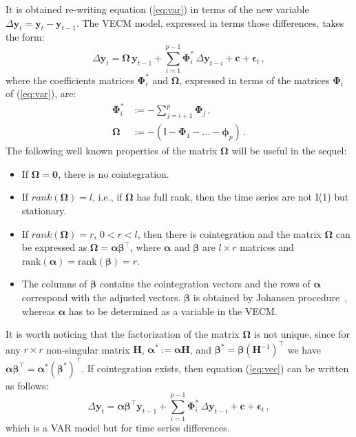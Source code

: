 It is obtained re-writing equation (\ref{eq:var}) in terms of the new
variable $\Delta\mathbf{y}_t=\mathbf{y}_t-\mathbf{y}_{t-1}$.
The VECM model, expressed in terms those differences, takes the form:
\begin{equation}\label{eq:vec}
\Delta \mathbf{y}_t 
= \boldsymbol{\Omega}\,\mathbf{y}_{t-1}
  + \sum_{i=1}^{p-1} \boldsymbol{\Phi}_i^*\,\Delta\mathbf{y}_{t-i}
  + \mathbf{c} + \boldsymbol{\epsilon}_t\,,
\end{equation}
\noindent
where the coefficients matrices $\boldsymbol{\Phi}_i^*$ and 
$\boldsymbol{\Omega}$, expressed in terms of the matrices
$\boldsymbol{\Phi}_i$ of (\ref{eq:var}), are:
\begin{align*}
\boldsymbol{\Phi}_i^* 
&:= -\sum_{j=i+1}^{p}\boldsymbol{\Phi}_j\,, \\
\boldsymbol{\Omega}
&:= -\left( \mathbb{I} - \boldsymbol{\Phi}_1 - \dots 
    - \boldsymbol{\phi}_p \right)\,. 
\end{align*}
The following well known properties of the matrix $\boldsymbol{\Omega}$
\cite{johansen1995} will be useful in the sequel:
\begin{itemize}
\item
If $\boldsymbol{\Omega} = \mathbf{0}$, there is no cointegration.
\item 
If $rank(\boldsymbol{\Omega})=l$, i.e., if $\boldsymbol{\Omega}$ has
full rank, then the time series are not I(1) but stationary.
\item
If $rank(\boldsymbol{\Omega})=r$, $0<r<l$, then there is cointegration
and the matrix $\boldsymbol{\Omega}$ can be expressed as
$\boldsymbol{\Omega}=\boldsymbol{\alpha\beta}^\top$, where $\boldsymbol{\alpha}$
and $\boldsymbol{\beta}$ are
$l\times r$ matrices and
$\text{rank}(\boldsymbol{\alpha})=\text{rank}(\boldsymbol{\beta})=r$.
\item
The columns of $\boldsymbol{\beta}$ contains the cointegration vectors and the rows of
$\boldsymbol{\alpha}$ correspond with the adjusted vectors. 
$\boldsymbol{\beta}$ is obtained by Johansen procedure~\cite{johansen1988},
whereas $\boldsymbol{\alpha}$ has to be determined as a variable in the VECM.
\end{itemize}
It is worth noticing that the factorization of the matrix
$\boldsymbol\Omega$ is not unique, since for any $r \times r$
non-singular matrix $\mathbf{H}$, $\boldsymbol{\alpha}^*:=\boldsymbol{\alpha}\mathbf{H}$,
and $\boldsymbol{\beta}^*=\boldsymbol{\beta}(\mathbf{H}^{-1})^\top$ we have
$\boldsymbol{\alpha\beta}^\top=\boldsymbol{\alpha}^*(\boldsymbol{\beta}^*)^\top$.
If cointegration exists, then equation (\ref{eq:vec}) can be written
as follows:
\begin{equation}\label{eq:vecfull}
\Delta\mathbf{y}_t 
= \boldsymbol{\alpha\beta}^\top\mathbf{y}_{t-1} 
  + \sum_{i=1}^{p-1}\boldsymbol{\Phi}_i^*\,\Delta\mathbf{y}_{t-i}
  + \mathbf{c} + \boldsymbol{\epsilon}_t\,,
\end{equation}
\noindent
which is a VAR model but for time series differences.


